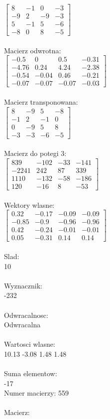 \documentclass[a4paper,12pt]{article}
\begin{document}
$\begin{bmatrix} 8&-1&0&-3\\-9&2&-9&-3\\5&-1&5&-6\\-8&0&8&-5 \end{bmatrix}$
\\
\\
Macierz odwrotna:\\

$\begin{bmatrix} -0.5&0&0.5&-0.31\\-4.76&0.24&4.24&-2.38\\-0.54&-0.04&0.46&-0.21\\-0.07&-0.07&-0.07&-0.03 \end{bmatrix}$
\\
\\
Macierz transponowana:\\

$\begin{bmatrix} 8&-9&5&-8\\-1&2&-1&0\\0&-9&5&8\\-3&-3&-6&-5 \end{bmatrix}$
\\
\\
Macierz do potegi 3:\\

$\begin{bmatrix} 839&-102&-33&-141\\-2241&242&87&339\\1110&-132&-58&-186\\120&-16&8&-53 \end{bmatrix}$
\\
\\
Wektory wlasne:\\

$\begin{bmatrix} 0.32&-0.17&-0.09&-0.09\\-0.85&-0.9&-0.96&-0.96\\0.42&-0.24&-0.01&-0.01\\0.05&-0.31&0.14&0.14 \end{bmatrix}$
\\
\\
Slad:\\
10
\\
\\
Wyznacznik:\\
-232
\\
\\
Odwracalnosc:\\
Odwracalna
\\
\\
Wartosci wlasne:\\
10.13 -3.08 1.48 1.48
\\
\\
Suma elementow:\\
-17
\\
\newpage
Numer macierzy:
559
\\
\\
Macierz:\\
\end{document}
